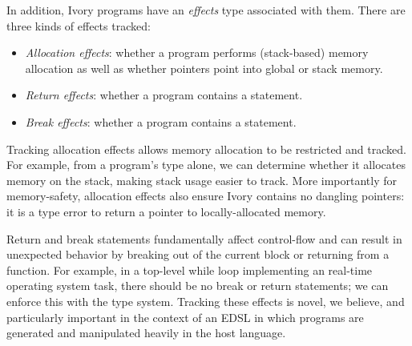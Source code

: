 

In addition, Ivory programs have an \emph{effects} type associated with them.
There are three kinds of effects tracked:
\begin{itemize}
  \item \emph{Allocation effects}: whether a program performs (stack-based)
    memory allocation as well as whether pointers point into global or stack memory.
  \item \emph{Return effects}: whether a program contains a  statement.
  \item \emph{Break effects}: whether a program contains a 
    statement.
\end{itemize}
\noindent
Tracking allocation effects allows memory allocation to be restricted and
tracked.  For example, from a program's type alone, we can determine whether it
allocates memory on the stack, making stack usage easier to track.  More
importantly for memory-safety, allocation effects also ensure Ivory contains no
dangling pointers: it is a type error to return a pointer to locally-allocated
memory.

Return and break statements fundamentally affect control-flow and can result in
unexpected behavior by breaking out of the current block or returning from a
function.  For example, in a top-level while loop implementing an real-time
operating system task, there should be no break or return statements; we can
enforce this with the type system.  Tracking these effects is novel, we believe,
and particularly important in the context of an EDSL in which programs are
generated and manipulated heavily in the host language.

